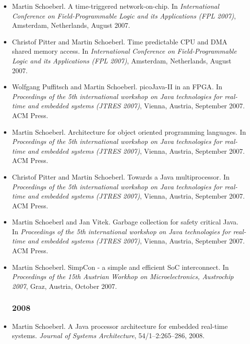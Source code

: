 \begin{itemize}
\item Martin Schoeberl.
A time-triggered network-on-chip.
In {\em International Conference on Field-Programmable Logic and its
  Applications (FPL 2007)}, Amsterdam, Netherlands, August 2007.

\item Christof Pitter and Martin Schoeberl.
Time predictable {CPU} and {DMA} shared memory access.
In {\em International Conference on Field-Programmable Logic and its
  Applications (FPL 2007)}, Amsterdam, Netherlands, August 2007.


\item Wolfgang Puffitsch and Martin Schoeberl.
{picoJava-II} in an {FPGA}.
In {\em Proceedings of the 5th international workshop on Java
  technologies for real-time and embedded systems (JTRES 2007)}, Vienna,
  Austria, September 2007. ACM Press.

\item Martin Schoeberl.
Architecture for object oriented programming languages.
In {\em Proceedings of the 5th international workshop on Java
  technologies for real-time and embedded systems (JTRES 2007)}, Vienna,
  Austria, September 2007. ACM Press.

\item Christof Pitter and Martin Schoeberl.
Towards a {Java} multiprocessor.
In {\em Proceedings of the 5th international workshop on Java
  technologies for real-time and embedded systems (JTRES 2007)}, Vienna,
  Austria, September 2007. ACM Press.

\item Martin Schoeberl and Jan Vitek.
Garbage collection for safety critical {Java}.
In {\em Proceedings of the 5th international workshop on Java
  technologies for real-time and embedded systems (JTRES 2007)}, Vienna,
  Austria, September 2007. ACM Press.

\item Martin Schoeberl. {SimpCon} - a simple and efficient {SoC}
    interconnect. In {\em Proceedings of the 15th Austrian
    Workhop on Microelectronics, Austrochip 2007}, Graz, Austria,
  October 2007.

\subsubsection*{2008}

\item Martin Schoeberl. A Java processor architecture for
    embedded real-time systems. {\em Journal of Systems
    Architecture}, 54/1--2:265--286, 2008.


\end{itemize}

